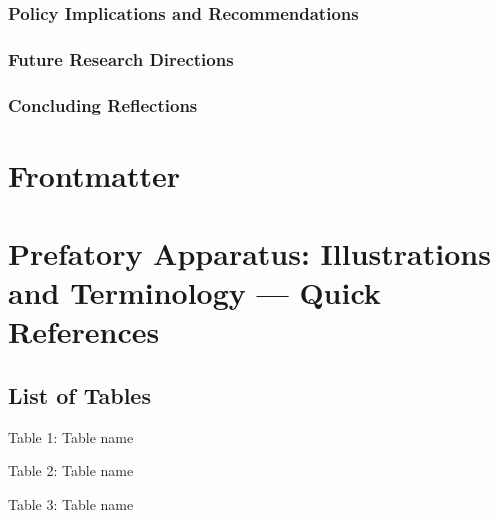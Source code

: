 \documentclass[
  letterpaper,
]{book}
\begin{document}
\subsection{Policy Implications and
Recommendations}\label{policy-implications-and-recommendations}

\subsection{Future Research
Directions}\label{future-research-directions}

\subsection{Concluding Reflections}\label{concluding-reflections}


\chapter*{Frontmatter}\label{frontmatter}



\chapter*{Prefatory Apparatus: Illustrations and Terminology --- Quick
References}\label{prefatory-apparatus-illustrations-and-terminology-quick-references}


\section*{List of Tables}\label{list-of-tables}


Table 1: Table name

Table 2: Table name

Table 3: Table name
\end{document}
